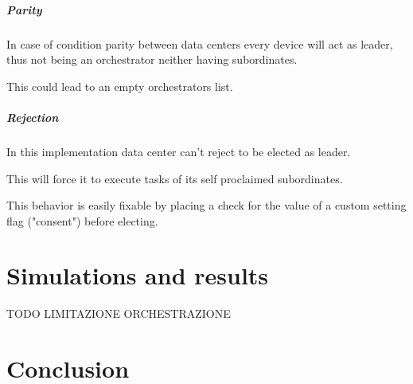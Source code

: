 \documentclass[12pt]{report}
\begin{document}
\paragraph{Parity}
In case of condition parity between data centers every device will act as leader, thus not being an orchestrator neither having subordinates.

This could lead to an empty orchestrators list.

\paragraph{Rejection}
In this implementation data center can't reject to be elected as leader. 

This will force it to execute tasks of its self proclaimed subordinates.

This behavior is easily fixable by placing a check for the value of a custom setting flag ("consent") before electing.


\chapter{Simulations and results}
TODO LIMITAZIONE ORCHESTRAZIONE
\chapter{Conclusion}

\printbibliography
\end{document}
